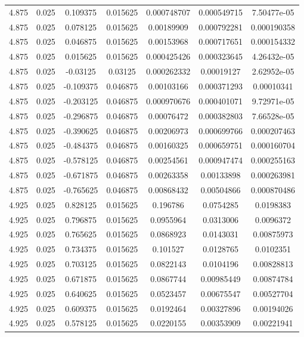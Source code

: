 \begin{flushleft}
\begin{longtable}{ccccccc}
4.875 & 0.025 & 0.109375 & 0.015625 & 0.000748707 & 0.000549715 & 7.50477e-05  \\ 
4.875 & 0.025 & 0.078125 & 0.015625 & 0.00189909 & 0.000792281 & 0.000190358  \\ 
4.875 & 0.025 & 0.046875 & 0.015625 & 0.00153968 & 0.000717651 & 0.000154332  \\ 
4.875 & 0.025 & 0.015625 & 0.015625 & 0.000425426 & 0.000323645 & 4.26432e-05  \\ 
4.875 & 0.025 & -0.03125 & 0.03125 & 0.000262332 & 0.00019127 & 2.62952e-05  \\ 
4.875 & 0.025 & -0.109375 & 0.046875 & 0.00103166 & 0.000371293 & 0.00010341  \\ 
4.875 & 0.025 & -0.203125 & 0.046875 & 0.000970676 & 0.000401071 & 9.72971e-05  \\ 
4.875 & 0.025 & -0.296875 & 0.046875 & 0.00076472 & 0.000382803 & 7.66528e-05  \\ 
4.875 & 0.025 & -0.390625 & 0.046875 & 0.00206973 & 0.000699766 & 0.000207463  \\ 
4.875 & 0.025 & -0.484375 & 0.046875 & 0.00160325 & 0.000659751 & 0.000160704  \\ 
4.875 & 0.025 & -0.578125 & 0.046875 & 0.00254561 & 0.000947474 & 0.000255163  \\ 
4.875 & 0.025 & -0.671875 & 0.046875 & 0.00263358 & 0.00133898 & 0.000263981  \\ 
4.875 & 0.025 & -0.765625 & 0.046875 & 0.00868432 & 0.00504866 & 0.000870486  \\ 
4.925 & 0.025 & 0.828125 & 0.015625 & 0.196786 & 0.0754285 & 0.0198383  \\ 
4.925 & 0.025 & 0.796875 & 0.015625 & 0.0955964 & 0.0313006 & 0.0096372  \\ 
4.925 & 0.025 & 0.765625 & 0.015625 & 0.0868923 & 0.0143031 & 0.00875973  \\ 
4.925 & 0.025 & 0.734375 & 0.015625 & 0.101527 & 0.0128765 & 0.0102351  \\ 
4.925 & 0.025 & 0.703125 & 0.015625 & 0.0822143 & 0.0104196 & 0.00828813  \\ 
4.925 & 0.025 & 0.671875 & 0.015625 & 0.0867744 & 0.00985449 & 0.00874784  \\ 
4.925 & 0.025 & 0.640625 & 0.015625 & 0.0523457 & 0.00675547 & 0.00527704  \\ 
4.925 & 0.025 & 0.609375 & 0.015625 & 0.0192464 & 0.00327896 & 0.00194026  \\ 
4.925 & 0.025 & 0.578125 & 0.015625 & 0.0220155 & 0.00353909 & 0.00221941  \\ 

\end{longtable}
\end{flushleft}
